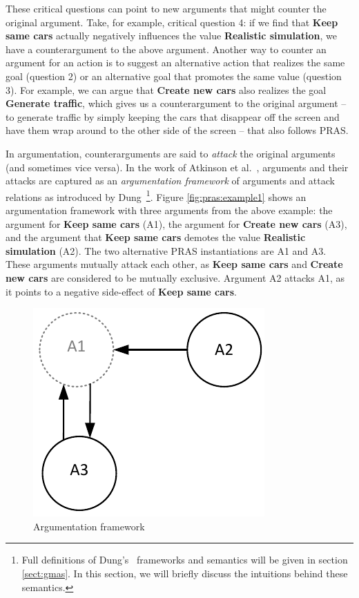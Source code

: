 These critical questions can point to new arguments that might counter the original argument. Take, for example, critical question 4: if we find that \textbf{Keep same cars} actually negatively influences the value \textbf{Realistic simulation}, we have a counterargument to the above argument. Another way to counter an argument for an action is to suggest an alternative action that realizes the same goal (question 2) or an alternative goal that promotes the same value (question 3). For example, we can argue that \textbf{Create new cars} also realizes the goal \textbf{Generate traffic}, which gives us a counterargument to the original argument -- to generate traffic by simply keeping the cars that disappear off the screen and have them wrap around to the other side of the screen -- that also follows PRAS. 

In argumentation, counterarguments are said to \emph{attack} the original arguments (and sometimes vice versa). In the work of Atkinson et al.~\cite{atkinson2007}, arguments and their attacks are captured as an \emph{argumentation framework} of arguments and attack relations as introduced by Dung~\cite{Dung1995}\footnote{Full definitions of Dung's~\cite{Dung1995} frameworks and semantics will be given in section \ref{sect:gmas}. In this section, we will briefly discuss the intuitions behind these semantics.}. Figure \ref{fig:pras:example1} shows an argumentation framework with three arguments from the above example: the argument for \textbf{Keep same cars} (A1), the argument for \textbf{Create new cars} (A3), and the argument that \textbf{Keep same cars} demotes the value \textbf{Realistic simulation} (A2). The two alternative PRAS instantiations are A1 and A3. These arguments mutually attack each other, as \textbf{Keep same cars}  and \textbf{Create new cars} are considered to be mutually exclusive. Argument A2 attacks A1, as it points to a negative side-effect of \textbf{Keep same cars}. 

\begin{figure}[ht]
\centering
\includegraphics[scale=0.8]{img/Fig1}
\caption{Argumentation framework}
\label{fig:pras:example}
\end{figure}

